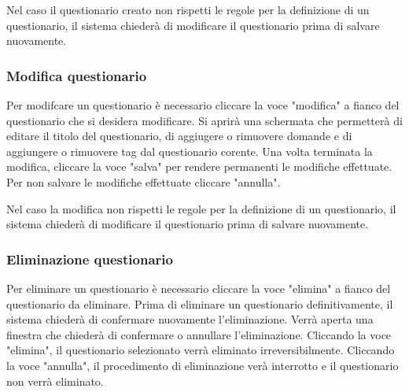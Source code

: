 \documentclass[12pt,a4paper]{article}
\begin{document}
			Nel caso il questionario creato non rispetti le regole per la definizione di un questionario, il sistema chiederà di modificare il questionario prima di salvare nuovamente.
		\subsubsection{Modifica questionario}
			Per modifcare un questionario è necessario cliccare la voce "modifica" a fianco del questionario che si desidera modificare. Si aprirà una schermata che permetterà di editare il titolo del questionario, di aggiugere o rimuovere domande e di aggiungere o rimuovere tag dal questionario corente.
			Una volta terminata la modifica, cliccare la voce "salva" per rendere permanenti le modifiche effettuate. Per non salvare le modifiche effettuate cliccare "annulla".
			
			Nel caso la modifica non rispetti le regole per la definizione di un questionario, il sistema chiederà di modificare il questionario prima di salvare nuovamente.
			
		\subsubsection{Eliminazione questionario}
		Per eliminare un questionario è necessario cliccare la voce "elimina" a fianco del questionario da eliminare. Prima di eliminare un questionario definitivamente, il sistema chiederà di confermare nuovamente l'eliminazione.
		Verrà aperta una finestra che chiederà di confermare o annullare l'eliminazione. Cliccando la voce "elimina", il questionario selezionato verrà eliminato irreversibilmente. Cliccando la voce "annulla", il procedimento di eliminazione verà interrotto e il questionario non verrà eliminato.

	
	
	


	
\end{document}
